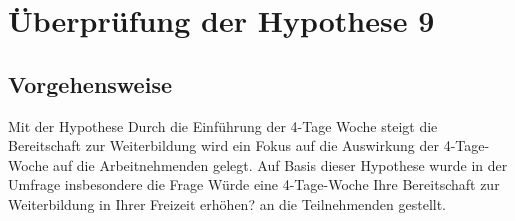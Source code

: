
\chapter{Überprüfung der Hypothese 9}
\label{chap:hypothese9}

\section{Vorgehensweise}
Mit der Hypothese \glqq{}Durch die Einführung der 4-Tage Woche steigt die Bereitschaft 
zur Weiterbildung \grqq{} wird ein Fokus auf die 
Auswirkung der 4-Tage-Woche auf die Arbeitnehmenden gelegt. Auf Basis dieser Hypothese 
wurde in der Umfrage
insbesondere die Frage \glqq{}Würde eine 4-Tage-Woche Ihre Bereitschaft zur Weiterbildung in 
Ihrer Freizeit erhöhen? \grqq{} an die Teilnehmenden gestellt.







